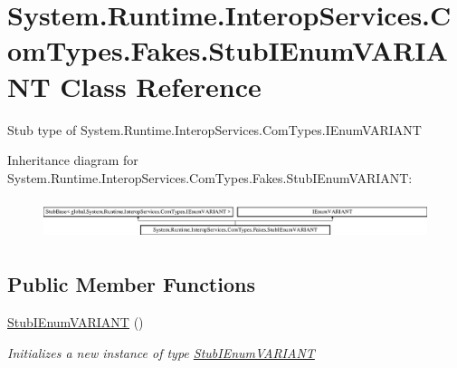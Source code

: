 \hypertarget{class_system_1_1_runtime_1_1_interop_services_1_1_com_types_1_1_fakes_1_1_stub_i_enum_v_a_r_i_a_n_t}{\section{System.\-Runtime.\-Interop\-Services.\-Com\-Types.\-Fakes.\-Stub\-I\-Enum\-V\-A\-R\-I\-A\-N\-T Class Reference}
\label{class_system_1_1_runtime_1_1_interop_services_1_1_com_types_1_1_fakes_1_1_stub_i_enum_v_a_r_i_a_n_t}
}


Stub type of System.\-Runtime.\-Interop\-Services.\-Com\-Types.\-I\-Enum\-V\-A\-R\-I\-A\-N\-T 


Inheritance diagram for System.\-Runtime.\-Interop\-Services.\-Com\-Types.\-Fakes.\-Stub\-I\-Enum\-V\-A\-R\-I\-A\-N\-T\-:\begin{figure}[H]
\begin{center}
\leavevmode
\includegraphics[height=1.188960cm]{class_system_1_1_runtime_1_1_interop_services_1_1_com_types_1_1_fakes_1_1_stub_i_enum_v_a_r_i_a_n_t}
\end{center}
\end{figure}
\subsection*{Public Member Functions}
\begin{DoxyCompactItemize}
\item 
\hyperlink{class_system_1_1_runtime_1_1_interop_services_1_1_com_types_1_1_fakes_1_1_stub_i_enum_v_a_r_i_a_n_t_a13082737cee871d3f199313f665671ff}{Stub\-I\-Enum\-V\-A\-R\-I\-A\-N\-T} ()
\begin{DoxyCompactList}\small\item\em Initializes a new instance of type \hyperlink{class_system_1_1_runtime_1_1_interop_services_1_1_com_types_1_1_fakes_1_1_stub_i_enum_v_a_r_i_a_n_t}{Stub\-I\-Enum\-V\-A\-R\-I\-A\-N\-T}\end{DoxyCompactList}\end{DoxyCompactItemize}
